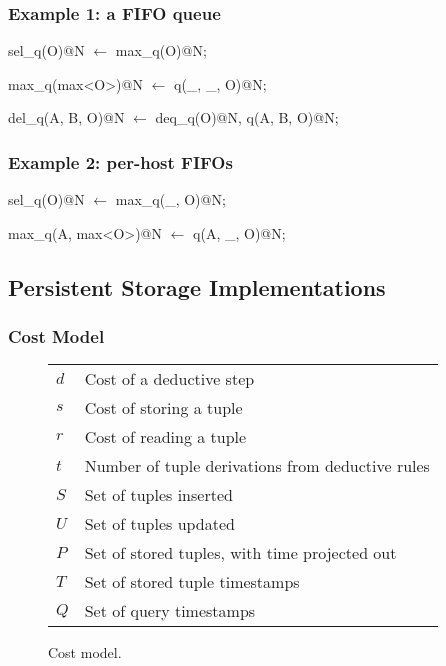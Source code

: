 \subsubsection{Example 1: a FIFO queue}

\begin{Dedalus}
sel\_q(O)@N \(\leftarrow\)
  max\_q(O)@N;

max\_q(max<O>)@N \(\leftarrow\)
  q(\_, \_, O)@N;

del\_q(A, B, O)@N \(\leftarrow\)
  deq\_q(O)@N,
  q(A, B, O)@N;
\end{Dedalus}

\subsubsection{Example 2: per-host FIFOs}

\begin{Dedalus}
sel\_q(O)@N \(\leftarrow\)
  max\_q(_, O)@N; 

max\_q(A, max<O>)@N \(\leftarrow\)
  q(A, \_, O)@N;
\end{Dedalus}


\subsection{Persistent Storage Implementations}


\subsubsection{Cost Model}

\begin{figure}[t]
\begin{tabular}{ll} \hline
$d$ & Cost of a deductive step \\
$s$ & Cost of storing a tuple \\
$r$ & Cost of reading a tuple \\ 
$t$ & Number of tuple derivations from deductive rules \\ 
\hline
$S$ & Set of tuples inserted \\
$U$ & Set of tuples updated \\
$P$ & Set of stored tuples, with time projected out \\ 
$T$ & Set of stored tuple timestamps \\ 
$Q$ & Set of query timestamps \\ \hline 
\end{tabular}
\caption{Cost model.}
\label{fig:breakdown}
\end{figure}


